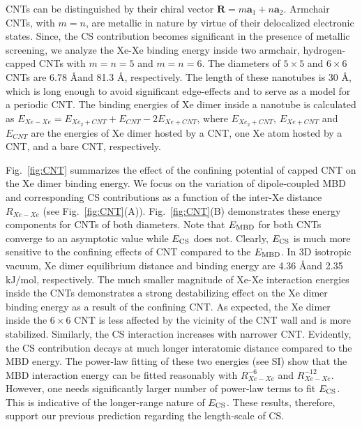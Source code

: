 \documentclass[aps,prl,groupaddress, twocolumn]{revtex4-1}
\begin{document}
CNTs can be distinguished by their chiral vector $\mathbf{R}=m \mathbf{a}_1 +n \mathbf{a}_2 $. 
Armchair CNTs, with $m=n$, are metallic in nature by virtue of their delocalized electronic states. Since, the CS contribution becomes significant in the presence of metallic screening\cite{sadhukhan_prl_2017}, we analyze the Xe-Xe binding energy inside two armchair, hydrogen-capped CNTs with $m = n = 5$ and $m = n = 6$. The diameters of $5\times5$ and $6\times6$ CNTs are 6.78 \AA and 81.3 \AA, respectively. The length of these nanotubes is 30 \AA, which is long enough to avoid significant edge-effects and to serve as a model for a periodic CNT. The binding energies of Xe dimer inside a nanotube is calculated as $E_{Xe-Xe} = E_{Xe_2+CNT}+E_{CNT} - 2 E_{Xe+CNT}$, where $E_{Xe_2+CNT}$, $E_{Xe+CNT}$ and $E_{CNT}$ are the energies of Xe dimer hosted by a CNT, one Xe atom hosted by a CNT, and a bare CNT, respectively. 

Fig.~\ref{fig:CNT} summarizes the effect of the confining potential of capped CNT on the Xe dimer binding energy. We focus on the variation of dipole-coupled MBD and corresponding CS contributions as a function of the inter-Xe distance $R_{Xe-Xe}$ (see Fig.~\ref{fig:CNT}(A)). Fig.~\ref{fig:CNT}(B) demonstrates these energy components for CNTs of both diameters. Note that $E_{\rm MBD}$ for both CNTs converge to an asymptotic value while $E_{\rm CS}$ does not. Clearly, $E_{\rm CS}$ is much more sensitive to the confining effects of CNT compared to the $E_{\rm MBD}$. In 3D isotropic vacuum, Xe dimer equilibrium distance and binding energy are 4.36 \AA and 2.35 kJ/mol, respectively\cite{Jerabek_2017}. The much smaller magnitude of Xe-Xe interaction energies inside the CNTs demonstrates a strong destabilizing effect on the Xe dimer binding energy as a result of the confining CNT. As expected, the Xe dimer inside the $6\times6$ CNT is less affected by the vicinity of the CNT wall and is more stabilized. Similarly, the CS interaction increases with narrower CNT. Evidently, the CS contribution decays at much longer interatomic distance compared to the MBD energy. The power-law fitting of these two energies (see SI) show that the MBD interaction energy can be fitted reasonably with $R_{Xe-Xe}^{-6}$ and $R_{Xe-Xe}^{-12}$. However, one needs significantly larger number of power-law terms to fit $E_{\rm CS}$. This is indicative of the longer-range nature of $E_{\rm CS}$. These results, therefore, support our previous prediction regarding the length-scale of CS\cite{sadhukhan_prl_2017, sadhukhan_prl_reply2018}. 
\end{document}
